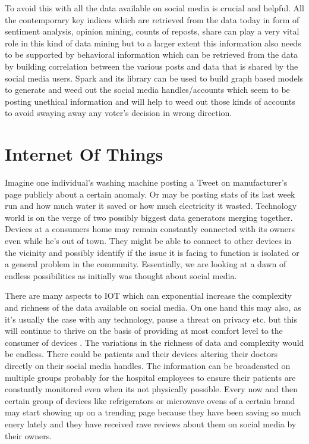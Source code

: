 \documentclass[sigconf]{acmart}
\begin{document}
To avoid this with all the data available on social media is crucial and helpful. All the contemporary key indices which are retrieved from the data today in form of sentiment analysis, opinion mining, counts of reposts, share can play a very vital role in this kind of data mining but to a larger extent this information also needs to be supported by behavioral information which can be retrieved from the data by building correlation between the various posts and data that is shared by the social media users. Spark and its library can be used to build graph based models to generate and weed out the social media handles/accounts which seem to be posting unethical information and will help to weed out those kinds of accounts to avoid swaying away any voter's decision in wrong direction.

\section{Internet Of Things}
Imagine one individual's washing machine posting a Tweet on manufacturer's page publicly about a certain anomaly. Or may be posting stats of its last week run and how much water it saved or how much electricity it wasted. Technology world is on the verge of two possibly biggest data generators merging together. Devices at a consumers home may remain constantly connected with its owners even while he's out of town. They might be able to connect to other devices in the vicinity and possibly identify if the issue it is facing to function is isolated or a general problem in the community. Essentially, we are looking at a dawn of endless possibilities as initially was thought about social media.

There are many aspects to IOT which can exponential increase the complexity and richness of the data available on social media. On one hand this may also, as it's usually the case with any technology, pause a threat on privacy etc. but this will continue to thrive on the basis of providing at most comfort level to the consumer of devices \cite{iotlawrence}. The variations in the richness of data and complexity would be endless. There could be patients and their devices altering their doctors directly on their social media handles. The information can be broadcasted on multiple groups probably for the hospital employees to ensure their patients are constantly monitored even when its not physically possible. Every now and then certain group of devices like refrigerators or microwave ovens of a certain brand may start showing up on a trending page because they have been saving so much enery lately and they have received rave reviews about them on social media by their owners.
\end{document}
